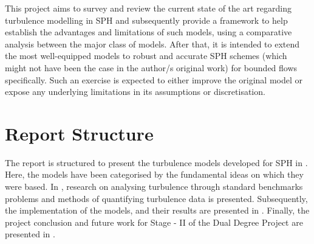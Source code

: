 This project aims to survey and review the current state of the art regarding turbulence modelling in SPH and subsequently provide a framework to help establish the advantages and limitations of such models, using a comparative analysis between the major class of models.
After that, it is intended to extend the most well-equipped models to robust and accurate SPH schemes (which might not have been the case in the author/s original work) for bounded flows specifically. Such an exercise is expected to either improve the original model or expose any underlying limitations in its assumptions or discretisation.

\section{Report Structure}
The report is structured to present the turbulence models developed for SPH in . Here, the models have been categorised by the fundamental ideas on which they were based. In , research on analysing turbulence through standard benchmarks problems and methods of quantifying turbulence data is presented.
Subsequently, the implementation of the models, and their results are presented in .
Finally, the project conclusion and future work for Stage - II of the Dual Degree Project are presented in .
